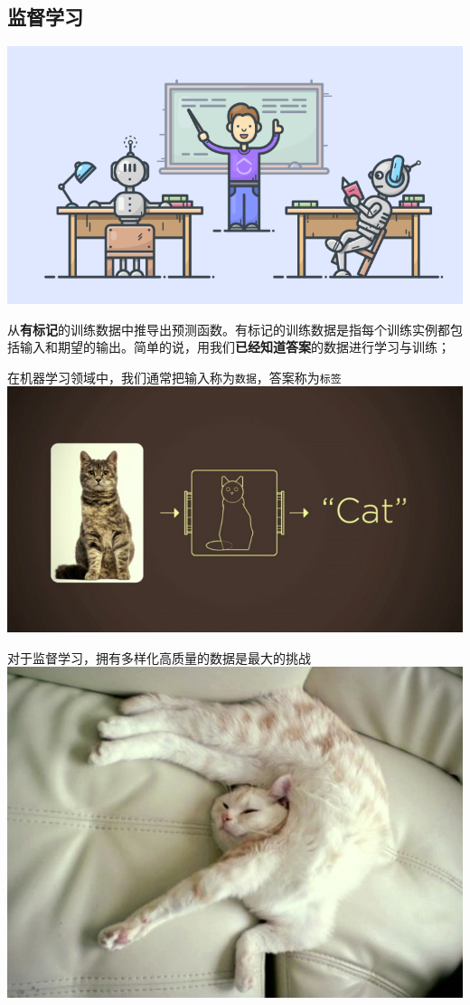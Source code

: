 \documentclass[11pt]{article}
\makeatletter
\def\maxwidth{\ifdim\Gin@nat@width>\linewidth\linewidth
    \else\Gin@nat@width\fi}
\let\Oldincludegraphics\includegraphics
\renewcommand{\includegraphics}[1]{\Oldincludegraphics[width=.8\maxwidth]{#1}}
\makeatother
\begin{document}
    \hypertarget{ux76d1ux7763ux5b66ux4e60}{%
\subsection{监督学习}\label{ux76d1ux7763ux5b66ux4e60}}

\includegraphics{img/supervised.png}

从\textbf{有标记}的训练数据中推导出预测函数。有标记的训练数据是指每个训练实例都包括输入和期望的输出。简单的说，用我们\textbf{已经知道答案}的数据进行学习与训练；

    在机器学习领域中，我们通常把输入称为\texttt{数据}，答案称为\texttt{标签}
\includegraphics{img/label.jpg}

    对于监督学习，拥有多样化高质量的数据是最大的挑战
\includegraphics{img/cat.jpg}
\end{document}
